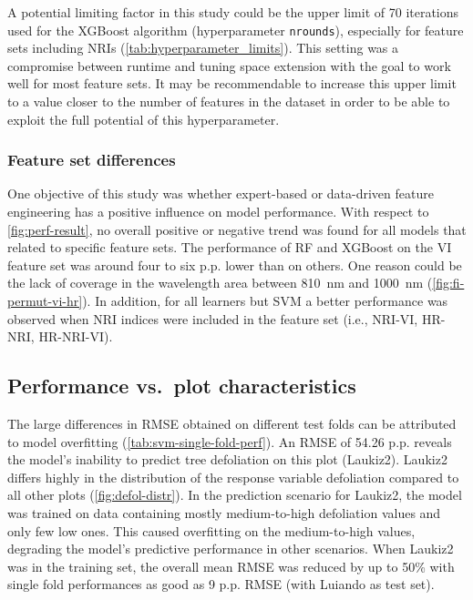 \documentclass[remotesensing,article,submit,moreauthors,pdftex]{Definitions/mdpi}
\begin{document}
A potential limiting factor in this study could be the upper limit of 70 iterations used for the XGBoost algorithm (hyperparameter \texttt{nrounds}), especially for feature sets including NRIs (\autoref{tab:hyperparameter_limits}).
This setting was a compromise between runtime and tuning space extension with the goal to work well for most feature sets.
It may be recommendable to increase this upper limit to a value closer to the number of features in the dataset in order to be able to exploit the full potential of this hyperparameter.

\subsubsection{Feature set differences}

One objective of this study was whether expert-based or data-driven feature engineering has a positive influence on model performance.
With respect to \autoref{fig:perf-result}, no overall positive or negative trend was found for all models that related to specific feature sets.
The performance of RF and XGBoost on the VI feature set was around four to six p.p. lower than on others.
One reason could be the lack of coverage in the wavelength area between 810~nm and 1000~nm (\autoref{fig:fi-permut-vi-hr}).
In addition, for all learners but SVM a better performance was observed when NRI indices were included in the feature set (i.e., NRI-VI, HR-NRI, HR-NRI-VI).

\subsection{Performance vs.\ plot characteristics}
\label{subsec:perf-plot-char}

The large differences in RMSE obtained on different test folds can be attributed to model overfitting (\autoref{tab:svm-single-fold-perf}).
An RMSE of 54.26 p.p. reveals the model's inability to predict tree defoliation on this plot (Laukiz2).
Laukiz2 differs highly in the distribution of the response variable defoliation compared to all other plots (\autoref{fig:defol-distr}).
In the prediction scenario for Laukiz2, the model was trained on data containing mostly medium-to-high defoliation values and only few low ones.
This caused overfitting on the medium-to-high values, degrading the model's predictive performance in other scenarios.
When Laukiz2 was in the training set, the overall mean RMSE was reduced by up to 50\% with single fold performances as good as 9 p.p. RMSE (with Luiando as test set).
\end{document}
